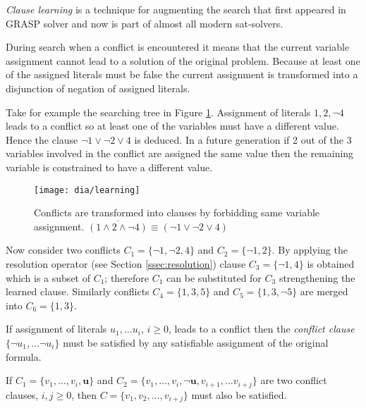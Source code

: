 \emph{Clause learning} is a technique for augmenting the search
that first appeared in GRASP solver \cite{Marques-silva99grasp:a}
and now is part of almost all modern sat-solvers.

During search when a conflict is encountered it means that the
current variable assignment cannot lead to a solution of the original
problem. Because at least one of the assigned literals must be false
the current assignment is transformed into a disjunction of negation
of assigned literals.

Take for example the searching tree in Figure \ref{fig:learning}.
Assignment of literals $1, 2, \neg 4$ leads to a conflict so at
least one of the variables must have a different value. Hence
the clause $\neg 1 \lor \neg 2 \lor 4$ is deduced. In a future
generation if 2 out of the 3 variables involved in the conflict are
assigned the same value then the remaining variable is constrained
to have a different value.

\begin{figure}
  \centering
  \texttt{[image: dia/learning]}
  \caption{Conflicts are transformed into clauses by forbidding
  same variable assignment.
  $\overline{(1 \land 2 \land \neg 4)} \equiv (\neg 1 \lor \neg 2 \lor 4)$}
  \label{fig:learning}
\end{figure}

Now consider two conflicts $C_1 = \{ \neg 1, \neg 2, 4 \}$ and
$C_2 = \{ \neg 1, 2 \}$.  By applying the resolution operator
(see Section \ref{ssec:resolution}) clause $C_3 = \{ \neg 1,
4 \}$ is obtained which is a subset of $C_1$; therefore $C_1$ can
be substituted for $C_3$ strengthening the learned clause. Similarly
conflicts $C_4 = \{ 1, 3, 5 \}$ and $C_5 = \{1, 3, \neg 5\}$ are
merged into $C_6 = \{ 1, 3 \}$.

\begin{myprop}
  If assignment of literals $u_1, \ldots u_i$, $i \ge 0$, leads to
  a conflict then the \emph{conflict clause} $\{ \neg u_1, \ldots
  \neg u_i \}$ must be satisfied by any satisfiable assignment of
  the original formula.
\end{myprop}

\begin{myprop}
  If $C_1 = \{ v_1, \ldots, v_i, \mathbf{u} \}$ and $C_2 = \{
  v_1, \ldots, v_i, \mathbf{\neg u}, v_{i+1}, \ldots v_{i+j} \}$
  are two conflict clauses, $i, j \ge 0$, then $C = \{ v_1, v_2,
  \ldots, v_{i+j} \}$ must also be satisfied.
\end{myprop}

